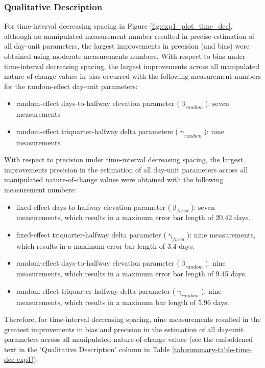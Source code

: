 \documentclass[
12pt, %
twoside,
english]{guelphthesis}
\begin{document}
\hypertarget{qualitative-time-dec-exp1}{%
\subsubsection{Qualitative Description}\label{qualitative-time-dec-exp1}}

For time-interval decreasing spacing in Figure \ref{fig:exp1_plot_time_dec}, although no manipulated measurement number resulted in precise estimation of all day-unit parameters, the largest improvements in precision (and bias) were obtained using moderate measurements numbers. With respect to bias under time-interval decreasing spacing, the largest improvements across all manipulated nature-of-change values in bias occurred with the following measurement numbers for the random-effect day-unit parameters:
\begin{itemize}
\tightlist
\item
  random-effect days-to-halfway elevation parameter (\(\upbeta_{random}\)): seven measurements
\item
  random-effect triquarter-halfway delta parameters (\(\upgamma_{random}\)): nine measurements
\end{itemize}
\noindent With respect to precision under time-interval decreasing spacing, the largest improvements precision in the estimation of all day-unit parameters across all manipulated nature-of-change values were obtained with the following measurement numbers:
\begin{itemize}
\tightlist
\item
  fixed-effect days-to-halfway elevation parameter (\(\upbeta_{fixed}\)): seven measurements, which results in a maximum error bar length of 20.42 days.
\item
  fixed-effect triquarter-halfway delta parameter (\(\upgamma_{fixed}\)): nine measurements, which results in a maximum error bar length of 3.4 days.
\item
  random-effect days-to-halfway elevation parameter (\(\upbeta_{random}\)): nine measurements, which results in a maximum error bar length of 9.45 days.
\item
  random-effect triquarter-halfway delta parameter (\(\upgamma_{random}\)): nine measurements, which results in a maximum bar length of 5.96 days.
\end{itemize}
\noindent Therefore, for time-interval decreasing spacing, nine measurements resulted in the greatest improvements in bias and precision in the estimation of all day-unit parameters across all manipulated nature-of-change values (see the emboldened text in the `Qualitative Description' column in Table \ref{tab:summary-table-time-dec-exp1}).
\end{document}
